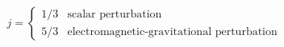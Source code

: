 \begin{equation} \label{j-rn}
j = \left\{ \begin{array}{cl}
              1/3  & \textrm{scalar perturbation} \\
              5/3  & \textrm{electromagnetic-gravitational perturbation}
            \end{array} \right.
\end{equation}

